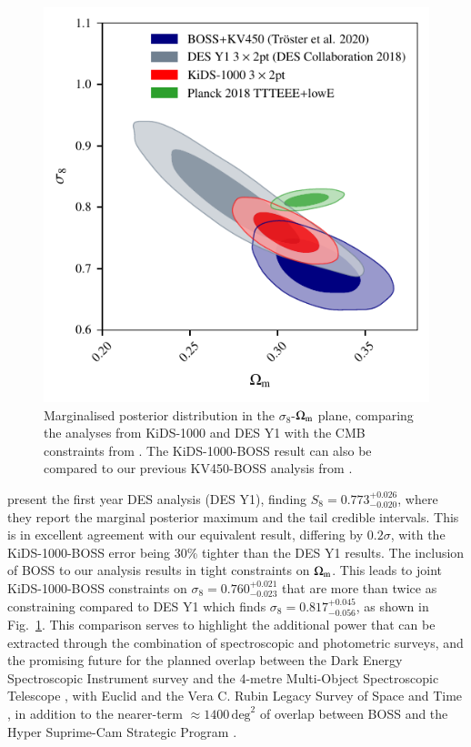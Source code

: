 \begin{figure}
	\begin{center}
		\includegraphics[width=\columnwidth]{Parameter_Plots/cosmology/omegam_sigma8_survey_comparison}
		\caption{Marginalised posterior distribution in the $\sigma_8$-$\Omega_{\rm m}$ plane, comparing the \tttp analyses from KiDS-1000 and DES Y1 \citep{abbott/etal:2018} with the CMB constraints from \citet{planck/etal:2018}.   The KiDS-1000-BOSS result can also be compared to our previous KV450-BOSS analysis from \citet{troester/etal:2020}. 
		\label{fig:DES_KiDS_comp}}
	\end{center}
\end{figure}


\citet{abbott/etal:2018} present the first year \tttp DES analysis (DES Y1), finding $S_8=0.773^{+0.026}_{-0.020}$, where they report the marginal posterior maximum and the tail credible intervals.  
This is in excellent agreement with our equivalent result, differing by $0.2\sigma$, with the KiDS-1000-BOSS error being 30\% tighter than the DES Y1 results.  The inclusion of BOSS to our \tttp analysis results in tight constraints on $\Omega_{\rm m}$.  
This leads to joint KiDS-1000-BOSS constraints on $\sigma_8=0.760^{+0.021}_{-0.023}$ that are more than twice as constraining compared to DES Y1 which finds $\sigma_8=0.817^{+0.045}_{-0.056}$, as shown in Fig.~\ref{fig:DES_KiDS_comp}. 
This comparison serves to highlight the additional power that can be extracted through the combination of spectroscopic and photometric surveys,  and the promising future for the planned overlap between the Dark Energy Spectroscopic Instrument survey \citep{DESI/etal:2016} and the 4-metre Multi-Object Spectroscopic Telescope \citep[4MOST,][]{guiglion/etal:2019},
with Euclid and the Vera C. Rubin Legacy Survey of Space and Time \citep{laureijs/etal:2011,lsst/etal:2009}, in addition to the nearer-term $\approx\!1400\,\mathrm{deg}^{2}$ of overlap between BOSS and the Hyper Suprime-Cam Strategic Program \citep[HSC,][]{aihara/etal:2019}. 

